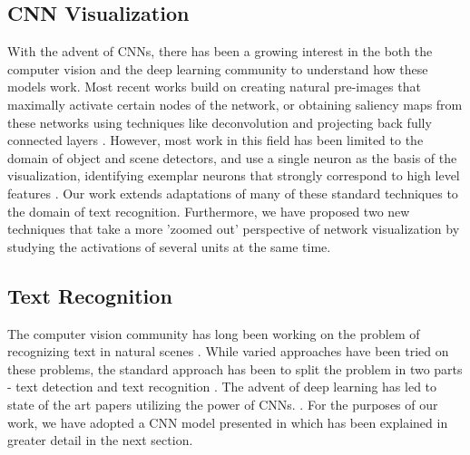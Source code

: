 \documentclass[10pt,twocolumn,letterpaper]{article}
\begin{document}
\subsection{CNN Visualization}
With the advent of CNNs, there has been a growing interest in the both the computer vision and the deep learning community to understand how these models work. Most recent works build on creating natural pre-images \cite{DBLP:journals/corr/MahendranV15} that maximally activate certain nodes of the network, or obtaining saliency maps from these networks using techniques like deconvolution \cite{DBLP:journals/corr/ZeilerF13} and
projecting back fully connected layers \cite{DBLP:journals/corr/SimonyanVZ13}. However, most work in this field has been limited to the domain of object and scene detectors, and use a single neuron as the basis of the visualization, identifying exemplar neurons that strongly correspond to high level features \cite{zhou2014object,DBLP:journals/corr/GirshickDDM13,DBLP:journals/corr/MahendranV15,DBLP:journals/corr/ZeilerF13,DBLP:journals/corr/SimonyanVZ13,mahendran2015understanding}. Our work extends adaptations of many of these standard techniques \cite{yosinski2015understanding} to the domain of text recognition. Furthermore, we have proposed two new techniques that take a more 'zoomed out' perspective of network visualization by studying the activations of several units at the same time.


\subsection{Text Recognition}


The computer vision community has long been working on the problem of recognizing text in natural scenes \cite{1315187}. While varied approaches have been tried on these problems, the standard approach has been to split the problem in two parts - text detection and text recognition \cite{PosnerEtAl-IROS2010,Neumann:2011:TLR:2066306.2067476,Yang:2014:FIV:2583855.2583972,6751121,KaiWang:2011:EST:2355573.2356398,Weinman:2014:TIS:2574225.2574484,DBLP:journals/corr/AlsharifP13,6751207}. The advent of deep learning has led to state of the art papers utilizing the power of CNNs. \cite{Jaderberg14,Jaderberg14d,Gupta16,6460871}. For the purposes of our work, we have adopted a CNN model presented in \cite{Jaderberg14c} which has been explained in greater detail in the next section.
\end{document}
